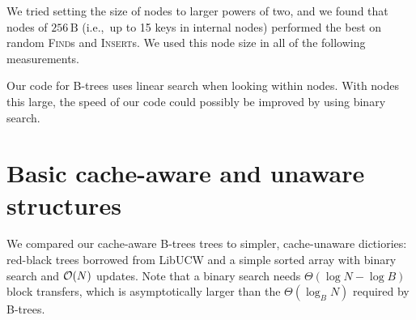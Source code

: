 We tried setting the size of nodes to larger powers of two, and we found
that nodes of $256\,\text{B}$ (i.e.,\ up to 15 keys in internal nodes)
performed the best on random \textsc{Find}s and \textsc{Insert}s.
We used this node size in all of the following measurements.

Our code for B-trees uses linear search when looking within nodes.
With nodes this large, the speed of our code could possibly be improved
by using binary search.

\section{Basic cache-aware and unaware structures}
We compared our cache-aware B-trees trees to simpler, cache-unaware dictiories:
red-black trees borrowed from LibUCW and a simple sorted array with binary
search and $\mathcal{O}(N)$ updates. Note that a binary search needs
$\Theta(\log N-\log B)$ block transfers, which is asymptotically larger than
the $\Theta(\log_B N)$ required by B-trees.


